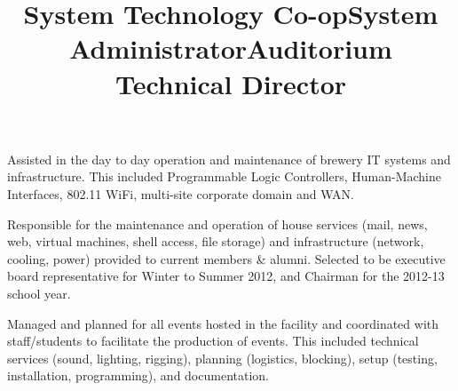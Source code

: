 \begin{resume}
\title{System Technology Co-op}
\begin{position}
Assisted in the day to day operation and maintenance of brewery IT systems and infrastructure. This included Programmable Logic Controllers, Human-Machine Interfaces, 802.11 WiFi, multi-site corporate domain and WAN.
\end{position}

\title{System Administrator}
\begin{position}
Responsible for the maintenance and operation of house services (mail, news, web, virtual machines, shell access, file storage) and infrastructure (network, cooling, power) provided to current members \& alumni. Selected to be executive board representative for Winter to Summer 2012, and Chairman for the 2012-13 school year.
\end{position}


\title{Auditorium Technical Director}
\begin{position}
Managed and planned for all events hosted in the facility and coordinated with staff/students to facilitate the production of events. This included technical services (sound, lighting, rigging), planning (logistics, blocking), setup (testing, installation, programming), and documentation. 
\end{position}



\end{resume}
